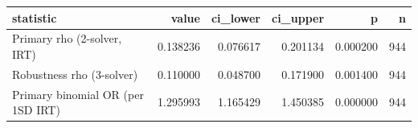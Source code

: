 \begin{tabular}{lrrrrr}
\toprule
statistic & value & ci\_lower & ci\_upper & p & n \\
\midrule
Primary rho (2-solver, IRT) & 0.138236 & 0.076617 & 0.201134 & 0.000200 & 944 \\
Robustness rho (3-solver) & 0.110000 & 0.048700 & 0.171900 & 0.001400 & 944 \\
Primary binomial OR (per 1SD IRT) & 1.295993 & 1.165429 & 1.450385 & 0.000000 & 944 \\
\bottomrule
\end{tabular}
